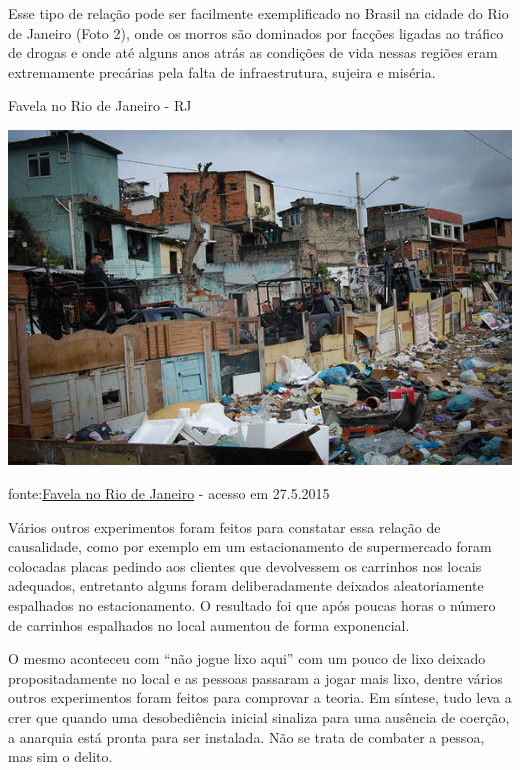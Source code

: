 \documentclass[
	12pt,				%
	openright,			%
	twoside,			%
	a4paper,			%
	chapter=TITLE,		%
	section=TITLE,		%
	subsection=TITLE,	%
	subsubsection=TITLE,%
	spanish,            %
	english,			%
	brazil				%
	]{abntex2}
\begin{document}
\par
Esse tipo de relação pode ser facilmente exemplificado no Brasil na cidade do Rio de Janeiro (Foto 2), onde os morros são dominados por facções ligadas ao tráfico de drogas e onde até alguns anos atrás as condições de vida nessas regiões eram extremamente precárias pela falta de infraestrutura, sujeira e miséria.
\begin{foto}[!htpb]
	\caption{\label{Fotoa}Favela no Rio de Janeiro - RJ}
    \begin{center}
    \includegraphics[scale=0.8]{FavelaRJ.jpg}
    \end{center}
    \ABNTEXchapterfont\small{fonte:\href{http://abordagempolicial.com/wp-content/uploads/2012/10/Ocupação-de-Favelas-no-Rio-de-Janeiro-UPP-4.jpg}{Favela no Rio de Janeiro} - acesso em 27.5.2015}
\end{foto}
\par
Vários outros experimentos foram feitos para constatar essa relação de causalidade, como por exemplo
em um estacionamento de supermercado foram colocadas placas pedindo aos clientes que devolvessem os
carrinhos nos locais adequados, entretanto alguns foram deliberadamente deixados aleatoriamente
espalhados no estacionamento. O resultado foi que após poucas horas o número de carrinhos espalhados  no local aumentou de forma exponencial.
\par
O mesmo aconteceu com “não jogue lixo aqui” com um pouco de lixo deixado propositadamente no local e as pessoas passaram a jogar mais lixo,
dentre vários outros experimentos foram feitos para comprovar a teoria. Em síntese, tudo leva a crer que
quando uma desobediência inicial sinaliza para uma ausência de coerção, a anarquia está pronta para ser
instalada. Não se trata de combater a pessoa, mas sim o delito.
\end{document}
